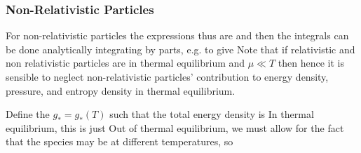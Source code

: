 \documentclass{article}
\begin{document}
\subsubsection*{Non-Relativistic Particles}
For non-relativistic particles the expressions thus are 
and then the integrals can be done analytically integrating by parts, e.g.
to give 
Note that if relativistic and non relativistic particles are in thermal equilibrium and $\mu \ll T$ then 
hence it is sensible to neglect non-relativistic particles' contribution to energy density, pressure, and entropy density in thermal equilibrium. 

\begin{definition}\label{def:CSM:1}
Define the  $g_\ast = g_\ast(T)$ such that the total energy density is
In thermal equilibrium, this is just
Out of thermal equilibrium, we must allow for the fact that the species may be at different temperatures, so 
\end{definition}
\end{document}
